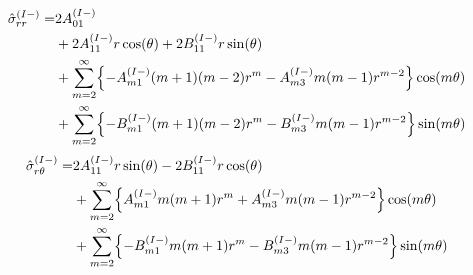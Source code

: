 \begin{align}
	\hat{\sigma}_{rr}^{(I-)} =&2A_{01}^{(I-)}
	\nonumber
	\\
	&+2A_{11}^{(I-)}r\cos(\theta)
	+2B_{11}^{(I-)}r\sin(\theta)
	\nonumber
	\\
	&+\sum_{m=2}^{\infty}\Bigl\{-A_{m1}^{(I-)}(m+1)(m-2)r^{m}
	-A_{m3}^{(I-)}m(m-1)r^{m-2}\Bigr\}\cos(m\theta)
	\nonumber
	\\
	&+\sum_{m=2}^{\infty}\Bigl\{-B_{m1}^{(I-)}(m+1)(m-2)r^{m}
	-B_{m3}^{(I-)}m(m-1)r^{m-2}\Bigr\}\sin(m\theta)
	\label{eq:SigmaRRIn1}
\end{align}
\begin{align}
	\hat{\sigma}_{r\theta}^{(I-)} =
	&2A_{11}^{(I-)}r\sin(\theta)
	-2B_{11}^{(I-)}r\cos(\theta)
	\nonumber
	\\
	&+\sum_{m=2}^{\infty}\Bigl\{A_{m1}^{(I-)}m(m+1)r^{m}
	+A_{m3}^{(I-)}m(m-1)r^{m-2}\Bigr\}\cos(m\theta)
	\nonumber
	\\
	&+\sum_{m=2}^{\infty}\Bigl\{-B_{m1}^{(I-)}m(m+1)r^{m}
	-B_{m3}^{(I-)}m(m-1)r^{m-2}\Bigr\}\sin(m\theta)
	\label{eq:SigmaRThIn1}
\end{align}

\newpage
